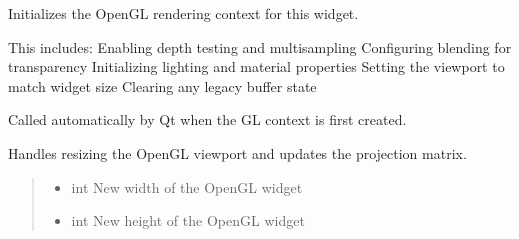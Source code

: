 \documentclass[a4paper,10pt,english,openany,oneside]{sphinxmanual}
\begin{document}
\begin{fulllineitems}
\begin{fulllineitems}
\label{\detokenize{api/ui:picogl.ui.backend.qt.base.GLBase.initializeGL}}
\pysigstartsignatures
\pysiglinewithargsret
{}
{}
{}
\pysigstopsignatures
\sphinxAtStartPar
Initializes the OpenGL rendering context for this widget.

\sphinxAtStartPar
This includes:
\sphinxhyphen{} Enabling depth testing and multisampling
\sphinxhyphen{} Configuring blending for transparency
\sphinxhyphen{} Initializing lighting and material properties
\sphinxhyphen{} Setting the viewport to match widget size
\sphinxhyphen{} Clearing any legacy buffer state

\sphinxAtStartPar
Called automatically by Qt when the GL context is first created.

\end{fulllineitems}


\begin{fulllineitems}
\label{\detokenize{api/ui:picogl.ui.backend.qt.base.GLBase.resizeGL}}
\pysigstartsignatures
\pysiglinewithargsret
{}
{\sphinxparamcomma {}}
{}
\pysigstopsignatures
\sphinxAtStartPar
Handles resizing the OpenGL viewport and updates the projection matrix.
\begin{quote}\begin{description}
\begin{itemize}
\item {} 
\sphinxAtStartPar
{} \textendash{} int \sphinxhyphen{} New width of the OpenGL widget

\item {} 
\sphinxAtStartPar
{} \textendash{} int \sphinxhyphen{} New height of the OpenGL widget

\end{itemize}

\end{description}\end{quote}

\end{fulllineitems}



\end{fulllineitems}
\end{document}
